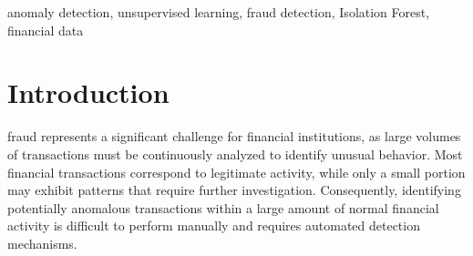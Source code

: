 \documentclass[journal]{IEEEtran}
\begin{document}
\begin{abstract}
Detecting financial fraud is usually a supervised learning problem, but in practice, labeled examples of fraud are rarely available. This study takes a different approach: instead of trying to classify transactions as fraudulent or not, it looks for transactions that simply behave differently from the rest. Using an Isolation Forest model on 3,293 unlabeled US bank transactions, unusual transactions are flagged and then explored from several angles, including how they change over time, what makes them behave differently, and where they tend to occur geographically. To make sure these findings are not just noise, the model is retrained with ten random seeds and SHAP is used to understand which features drive each anomaly. An interactive map of the United States is also used to show where the anomalies are concentrated. The results show that the model's ranking of unusual transactions is consistent across runs, that a threshold fixed on past data flags three times more transactions in later months, that flagged transactions stand out mainly because of their amount, and that the geographic pattern depends mostly on sample size, all without ever needing labeled fraud data. A second model trained only on the 2,512 real transactions shows that the drift over time and the importance of the amount remain, while the night, weekend, and state-level patterns appear only when the synthetic rows are included.
\end{abstract}

\begin{IEEEkeywords}
anomaly detection, unsupervised learning, fraud detection, Isolation Forest, financial data
\end{IEEEkeywords}



\section{Introduction}

 fraud represents a significant challenge for financial institutions, as large volumes of transactions must be continuously analyzed to identify unusual behavior. Most financial transactions correspond to legitimate activity, while only a small portion may exhibit patterns that require further investigation. Consequently, identifying potentially anomalous transactions within a large amount of normal financial activity is difficult to perform manually and requires automated detection mechanisms.
\end{document}
